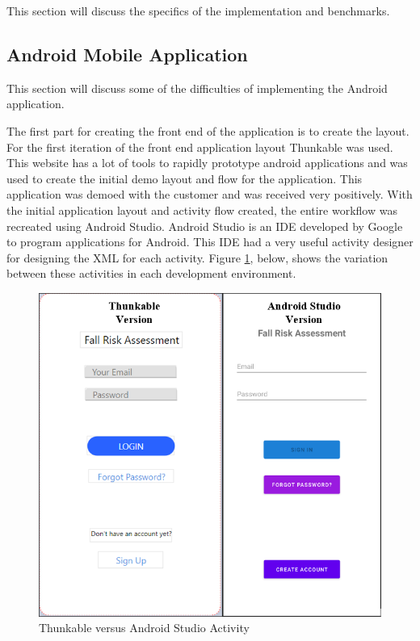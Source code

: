 \documentclass[conference]{IEEEtran}
\begin{document}
This section will discuss the specifics of the implementation and benchmarks.

\subsection{Android Mobile Application}
This section will discuss some of the difficulties of implementing the Android application. 

The first part for creating the front end of the application is to create the layout. For the first iteration of the front end application layout Thunkable was used. This website has a lot of tools to rapidly prototype android applications and was used to create the initial demo layout and flow for the application. This application was demoed with the customer and was received very positively. With the initial application layout and activity flow created, the entire workflow was recreated using Android Studio. Android Studio is an IDE developed by Google to program applications for Android. This IDE had a very useful activity designer for designing the XML for each activity. Figure \ref{thunkvsandroid}, below, shows the variation between these activities in each development environment.

\begin{figure}[!htb]
\centering
\includegraphics[scale=0.5]{img/Thunkable_vs_android_studio.png}
\caption{Thunkable versus Android Studio Activity}
\label{thunkvsandroid}
\end{figure}
\end{document}
